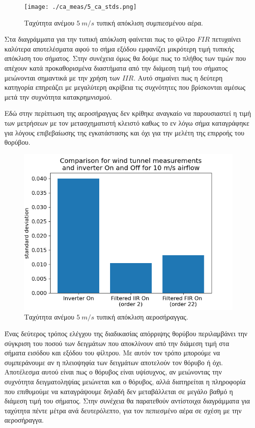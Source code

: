 \documentclass[breaklines=true, 12pt]{article}
\begin{document}
{{{\begin{figure}[h]
\centerline{\texttt{[image: ./ca\_meas/5\_ca\_stds.png]}}
\caption{Ταχύτητα ανέμου \(5\ m/s\) τυπική απόκλιση συμπιεσμένου αέρα.}
\label{fig:ca-0-std}
\end{figure}

Στα διαγράμματα για την τυπική απόκλιση φαίνεται πως το φίλτρο \(FIR\)
πετυχαίνει καλύτερα αποτελέσματα αφού το σήμα εξόδου εμφανίζει μικρότερη τιμή
τυπικής απόκλιση του σήματος. Στην συνέχεια όμως θα δούμε πως το πλήθος των
τιμών που απέχουν κατά προκαθορισμένα διαστήματα από την διάμεση τιμή του σήματος
μειώνονται σημαντικά με την χρήση των \(IIR\). Αυτό σημαίνει πως η δεύτερη
κατηγορία επηρεάζει με μεγαλύτερη ακρίβεια τις συχνότητες που βρίσκονται
αμέσως μετά την συχνότητα κατακρημνισμού.

Εδώ στην περίπτωση της αεροσήραγγας δεν κρίθηκε αναγκαίο να παρουσιαστεί
η τιμή των μετρήσεων με τον μετασχηματιστή κλειστό καθως το εν λόγω σήμα
καταγράφηκε για λόγους επιβεβαίωσης της εγκατάστασης και όχι για την μελέτη
της επιρροής του θορύβου.

\begin{figure}[t]
\centerline{\includegraphics[scale=1.]{./src/std_wt_new.png}}
\caption{Ταχύτητα ανέμου \(5\ m/s\) τυπική απόκλιση αεροσήραγγας.}
\label{fig:wt-0-std}
\end{figure}

Ένας δεύτερος τρόπος ελέγχου της διαδικασίας απόρριψης θορύβου περιλαμβάνει
την σύγκριση του ποσού των δειγμάτων που αποκλίνουν από την διάμεση τιμή στα
σήματα εισόδου και εξόδου του φίλτρου. Με αυτόν τον τρόπο μπορούμε να
συμπεράνουμε αν η πλειοψηφία των δειγμάτων αποτελούν τον θόρυβο ή όχι.
Αποτέλεσμα αυτού είναι πως ο θόρυβος είναι υψίσυχνος, αν μειώνοντας την
συχνότητα δειγματοληψίας μειώνεται και ο θόρυβος, αλλά διατηρείται η
πληροφορία που επιθυμούμε να καταγράψουμε δηλαδή δεν μεταβάλλεται σε μεγάλο
βαθμό η διάμεση τιμή του σήματος. Στην συνέχεια θα παρατεθούν αντίστοιχα
διαγράμματα για ταχύτητα πέντε μέτρα ανά δευτερόλεπτο, για τον
πεπιεσμένο αέρα σε σχέση με την αεροσήραγγα.

}}}
\end{document}
